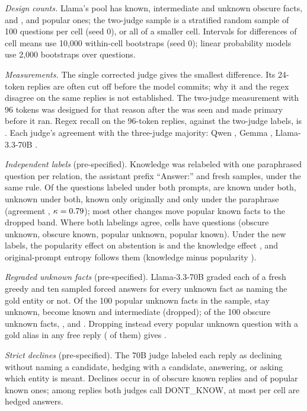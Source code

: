 \documentclass{article}
\begin{document}
\emph{Design counts.} Llama's pool has \lkObsPoolKnown{} known, \lkObsPoolMaybe{} intermediate and \lkObsPoolUnk{} unknown obscure facts, and \lkPopPoolKnown{}, \lkPopPoolMaybe{} and \lkPopPoolUnk{} popular ones; the two-judge sample is a stratified random sample of 100 questions per cell (seed 0), or all of a smaller cell. Intervals for differences of cell means use 10,000 within-cell bootstraps (seed 0); linear probability models use 2,000 bootstraps over questions.

\emph{Measurements.} The single corrected judge gives the smallest difference. Its 24-token replies are often cut off before the model commits; why it and the regex disagree on the same replies is not established. The two-judge measurement with 96 tokens was designed for that reason after the \hjLlamaDiff{} was seen and made primary before it ran. Regex recall on the 96-token replies, against the two-judge labels, is \hmLlamaRegexRecall. Each judge's agreement with the three-judge majority: Qwen \lkMajQwen, Gemma \lkMajGemma, Llama-3.3-70B \lkMajLlama.

\emph{Independent labels} (pre-specified). Knowledge was relabeled with one paraphrased question per relation, the assistant prefix ``Answer:'' and fresh samples, under the same rule. Of the \lcBothN{} questions labeled under both prompts, \lcKK{} are known under both, \lcUU{} unknown under both, \lcKU{} known only originally and \lcUK{} only under the paraphrase (agreement \lcAgree, $\kappa=0.79$); most other changes move popular known facts to the dropped band. Where both labelings agree, cells have \lcConsN{} questions (obscure unknown, obscure known, popular unknown, popular known). Under the new labels, the popularity effect on abstention is \eoPop{} \eoPopCI{} and the knowledge effect \eoKnow{} \eoKnowCI, and original-prompt entropy follows them (knowledge minus popularity \eoEntKmP{} \eoEntKmPCI).

\emph{Regraded unknown facts} (pre-specified). Llama-3.3-70B graded each of a fresh greedy and ten sampled forced answers for every unknown fact as naming the gold entity or not. Of the 100 popular unknown facts in the sample, \sePUStay{} stay unknown, \sePUKnown{} become known and \sePUInter{} intermediate (dropped); of the 100 obscure unknown facts, \seOUStay{}, \seOUKnown{} and \seOUInter. Dropping instead every popular unknown question with a gold alias in any free reply (\lcPUAlias{} of them) gives \lcAliasDrop{} \lcAliasDropCI.

\emph{Strict declines} (pre-specified). The 70B judge labeled each reply as declining without naming a candidate, hedging with a candidate, answering, or asking which entity is meant. Declines occur in \sdObsKnown{} of obscure known replies and \sdPopKnown{} of popular known ones; among replies both judges call DONT\_KNOW, at most \sdHedgedMax{} per cell are hedged answers.
\end{document}
